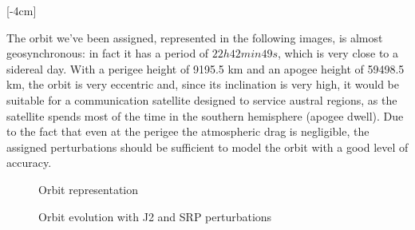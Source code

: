\documentclass[11pt,a4paper]{report}
\begin{document}
\begin{table}[H]
\centering
{}
\caption{Mission requirements}
\label{tab:Mission_requirements}
\end{table}

[-4cm]

The orbit we've been assigned, represented in the following images, is almost geosynchronous: in fact it has a period of $22h 42 min 49s$, which is very close to a sidereal day. With a perigee height of 9195.5 km and an apogee height of 59498.5 km, the orbit is very eccentric and, since its inclination is very high, it would be suitable for a communication satellite designed to service austral regions, as the satellite spends most of the time in the southern hemisphere (apogee dwell).  
Due to the fact that even at the perigee the atmospheric drag is negligible, the assigned perturbations should be sufficient to model the orbit with a good level of accuracy.

\begin{figure}[H]
\centering
{}
\caption{Orbit representation}
\end{figure}

\begin{figure}[H]
\centering
{}
\caption{Orbit evolution with J2 and SRP perturbations}
\end{figure}
\end{document}
